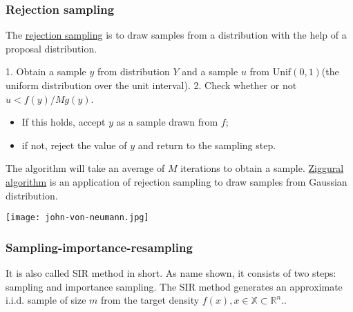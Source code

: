 \documentclass[titlestyle=hang,11pt]{elegantbook}
\begin{document}
\subsubsection{Rejection sampling}
The \href{https://www.wikiwand.com/en/Rejection_sampling}{rejection sampling} is to draw samples from a distribution with the help of a proposal distribution.


1.   Obtain a sample $y$ from distribution $Y$ and a sample $u$ from $\mathrm{Unif}(0,1)$(the uniform distribution over the unit interval).
2.   Check whether or not $u<f(y)/Mg(y)$.
	\begin{itemize}
      \item   If this holds, accept $y$ as a sample drawn from $f$;
	  \item   if not, reject the value of $y$ and return to the sampling step.
	\end{itemize}

The algorithm will take an average of $M$ iterations to obtain a sample.
\href{https://www.wikiwand.com/en/Ziggurat_algorithm}{Ziggural algorithm} is an application of rejection sampling to draw samples from Gaussian distribution.

		
\texttt{[image: john-von-neumann.jpg]}  

\subsubsection{Sampling-importance-resampling}

It is also called SIR method in short. As name shown, it consists of two steps: sampling and importance sampling.
The SIR method generates an approximate i.i.d. sample of size $m$ from the target density
 $f(x),x\in \mathbb{X}\subset\mathbb{R}^n.$.
\end{document}

